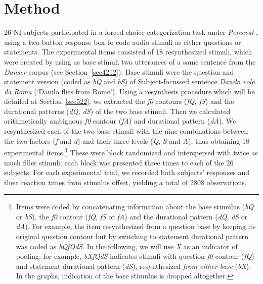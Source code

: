 \section{Method}\label{sec52}
26 NI subjects participated in a forced-choice categorization task under \textit{Perceval} \citep{andre2003perceval}, using a two-button response box to code audio stimuli as either questions or statements. The experimental items consisted of 18 resynthesized stimuli, which were created by using as base stimuli two utterances of a same sentence from the \textit{Danser} corpus (see Section~\ref{sec4212}). Base stimuli were the question and statement version (coded as \textit{bQ} and \textit{bS}) of Subject-focussed sentence \textit{Danilo vola da Roma} (`Danilo flies from Rome'). Using a resynthesis procedure which will be detailed at Section~\ref{sec522}, we extracted the \textit{f0} contours (\textit{fQ, fS}) and the durational patterns (\textit{dQ, dS}) of the two base stimuli. Then we calculated arithmetically ambiguous \textit{f0} contour (\textit{fA}) and durational pattern (\textit{dA}). We resynthesized each of the two base stimuli with the nine combinations between the two factors (\textit{f} and \textit{d}) and their three levels (\textit{Q}, \textit{S} and \textit{A}), thus obtaining 18 experimental items.\footnote{Items were coded by concatenating information about the base stimulus (\textit{bQ} or \textit{bS}), the \textit{f0} contour (\textit{fQ}, \textit{fS} or \textit{fA}) and the durational pattern (\textit{dQ}, \textit{dS} or \textit{dA}). For example, the item resynthesized from a question base by keeping its original question contour but by switching to statement durational pattern was coded as \textit{bQfQdS}. In the following, we will use \textit{X} as an indicator of pooling: for example, \textit{bXfQdS} indicates stimuli with question \textit{f0} contour (\textit{fQ}) and statement durational pattern (\textit{dS}), resynthesized \textit{from either base} (\textit{bX}). In the graphs, indication of the base stimulus is dropped altogether.} These were block randomized and interspersed with twice as much filler stimuli; each block was presented three times to each of the 26 subjects. For each experimental trial, we recorded both subjects' responses and their reaction times from stimulus offset, yielding a total of 2808 observations.
